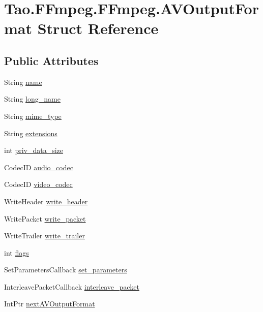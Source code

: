 \hypertarget{struct_tao_1_1_f_fmpeg_1_1_f_fmpeg_1_1_a_v_output_format}{
\section{Tao.FFmpeg.FFmpeg.AVOutputFormat Struct Reference}
\label{struct_tao_1_1_f_fmpeg_1_1_f_fmpeg_1_1_a_v_output_format}
}
\subsection*{Public Attributes}
\begin{DoxyCompactItemize}
\item 
String \hyperlink{struct_tao_1_1_f_fmpeg_1_1_f_fmpeg_1_1_a_v_output_format_a8dc52ab29b03095edf62ab94ae2d49d9}{name}
\item 
String \hyperlink{struct_tao_1_1_f_fmpeg_1_1_f_fmpeg_1_1_a_v_output_format_aee381f7e5eedd6da09d9abc0eaf90fcb}{long\_\-name}
\item 
String \hyperlink{struct_tao_1_1_f_fmpeg_1_1_f_fmpeg_1_1_a_v_output_format_a22596f6b151c576998f8ae8fff0d83e0}{mime\_\-type}
\item 
String \hyperlink{struct_tao_1_1_f_fmpeg_1_1_f_fmpeg_1_1_a_v_output_format_a1f9cbd96358132f934470c4cffb5511e}{extensions}
\item 
int \hyperlink{struct_tao_1_1_f_fmpeg_1_1_f_fmpeg_1_1_a_v_output_format_a0f938a71bf67e8f0ab1464dee6339381}{priv\_\-data\_\-size}
\item 
CodecID \hyperlink{struct_tao_1_1_f_fmpeg_1_1_f_fmpeg_1_1_a_v_output_format_aa195bdc2726342bdf0a9c118b22309b0}{audio\_\-codec}
\item 
CodecID \hyperlink{struct_tao_1_1_f_fmpeg_1_1_f_fmpeg_1_1_a_v_output_format_ac5a05c1f198825ca5b8c20a635d3de18}{video\_\-codec}
\item 
WriteHeader \hyperlink{struct_tao_1_1_f_fmpeg_1_1_f_fmpeg_1_1_a_v_output_format_a34713f8d6547dd169040adaf767094b0}{write\_\-header}
\item 
WritePacket \hyperlink{struct_tao_1_1_f_fmpeg_1_1_f_fmpeg_1_1_a_v_output_format_a21e22012b834a6e67a733c1a67b170c4}{write\_\-packet}
\item 
WriteTrailer \hyperlink{struct_tao_1_1_f_fmpeg_1_1_f_fmpeg_1_1_a_v_output_format_abfbda8b11007192e7ccb2dbee309c096}{write\_\-trailer}
\item 
int \hyperlink{struct_tao_1_1_f_fmpeg_1_1_f_fmpeg_1_1_a_v_output_format_a5bbbd7a33be7b4fb6e2ece064a9bad79}{flags}
\item 
SetParametersCallback \hyperlink{struct_tao_1_1_f_fmpeg_1_1_f_fmpeg_1_1_a_v_output_format_a0589e29667153c7410abdbcc584c9f00}{set\_\-parameters}
\item 
InterleavePacketCallback \hyperlink{struct_tao_1_1_f_fmpeg_1_1_f_fmpeg_1_1_a_v_output_format_afe452a8fea5802abb2725ba13af7b532}{interleave\_\-packet}
\item 
IntPtr \hyperlink{struct_tao_1_1_f_fmpeg_1_1_f_fmpeg_1_1_a_v_output_format_a0231b2fc2e6909af40033fb3f693a1f8}{nextAVOutputFormat}
\end{DoxyCompactItemize}


